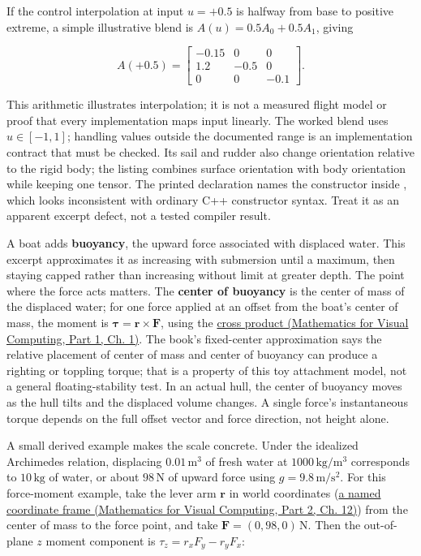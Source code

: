 If the control interpolation at input \(u=+0.5\) is halfway from base to positive extreme, a simple illustrative blend is \(A(u)=0.5A_0+0.5A_1\), giving

\[
A(+0.5)=\begin{bmatrix}-0.15&0&0\\1.2&-0.5&0\\0&0&-0.1\end{bmatrix}.
\]

This arithmetic illustrates interpolation; it is not a measured flight model or proof that every implementation maps input linearly. The worked blend uses \(u\in[-1,1]\); handling values outside the documented range is an implementation contract that must be checked. Its sail and rudder also change orientation relative to the rigid body; the  listing combines surface orientation with body orientation while keeping one tensor. The printed declaration names the constructor  inside , which looks inconsistent with ordinary C++ constructor syntax. Treat it as an apparent excerpt defect, not a tested compiler result.

A boat adds \textbf{buoyancy}, the upward force associated with displaced water. This excerpt approximates it as increasing with submersion until a maximum, then staying capped rather than increasing without limit at greater depth. The point where the force acts matters. The \textbf{center of buoyancy} is the center of mass of the displaced water; for one force applied at an offset from the boat's center of mass, the moment is \(\boldsymbol{\tau}=\mathbf{r}\times\mathbf{F}\), using the \href{../02-Mathematics-for-Visual-Computing-P01/main.pdf\#nameddest=01-foundations-i-ch017-the-cross-product-and-its-definition}{cross product (Mathematics for Visual Computing, Part 1, Ch. 1)}. The book's fixed-center approximation says the relative placement of center of mass and center of buoyancy can produce a righting or toppling torque; that is a property of this toy attachment model, not a general floating-stability test. In an actual hull, the center of buoyancy moves as the hull tilts and the displaced volume changes. A single force's instantaneous torque depends on the full offset vector and force direction, not height alone.

A small derived example makes the scale concrete. Under the idealized Archimedes relation, displacing \(0.01\,\mathrm{m^3}\) of fresh water at \(1000\,\mathrm{kg/m^3}\) corresponds to \(10\,\mathrm{kg}\) of water, or about \(98\,\mathrm{N}\) of upward force using \(g=9.8\,\mathrm{m/s^2}\). For this force-moment example, take the lever arm \(\mathbf r\) in world coordinates (\href{../02-Mathematics-for-Visual-Computing-P02/main.pdf\#nameddest=02-foundations-ii-ch028-higher-precision-and-local-coordinate-frames}{a named coordinate frame (Mathematics for Visual Computing, Part 2, Ch. 12)}) from the center of mass to the force point, and take \(\mathbf F=(0,98,0)\,\mathrm{N}\). Then the out-of-plane \(z\) moment component is \(\tau_z=r_xF_y-r_yF_x\):


